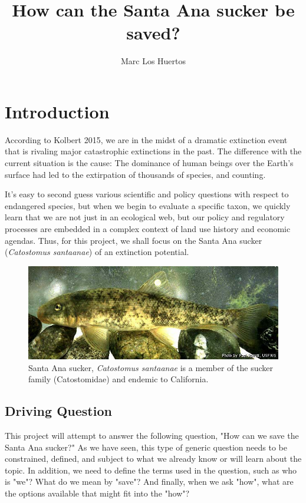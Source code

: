\documentclass{tufte-handout}\usepackage[]{graphicx}\usepackage[]{color}
\title{How can the Santa Ana sucker be saved?}
\author{Marc Los Huertos}
\begin{document}
\maketitle

\section{Introduction}

According to Kolbert 2015, we are in the midst of a dramatic extinction event that is rivaling major catastrophic extinctions in the past. The difference with the current situation is the cause: The dominance of human beings over the Earth's surface had led to the extirpation of thousands of species, and counting. 

It's easy to second guess various scientific and policy questions with respect to endangered species, but when we begin to evaluate a specific taxon, we quickly learn that we are not just in an ecological web, but our policy and regulatory processes are embedded in a complex context of land use history and economic agendas. Thus, for this project, we shall focus on the Santa Ana sucker (\emph{Catostomus santaanae}) of an extinction potential.  

\begin{figure}
    \includegraphics[width=1.0\textwidth]{Catostomus_santaanae.jpg}
  \caption{Santa Ana sucker, \emph{Catostomus santaanae} is a member of the sucker family (Catostomidae) and endemic to California.}
\end{figure}

\subsection{Driving Question}

This project will attempt to answer the following question, "How can we save the Santa Ana sucker?" As we have seen, this type of generic question needs to be constrained, defined, and subject to what we already know or will learn about the topic. In addition, we need to define the terms used in the question, such as who is "we"? What do we mean by "save"?  And finally, when we ask "how", what are the options available that might fit into the "how"? 
\end{document}
